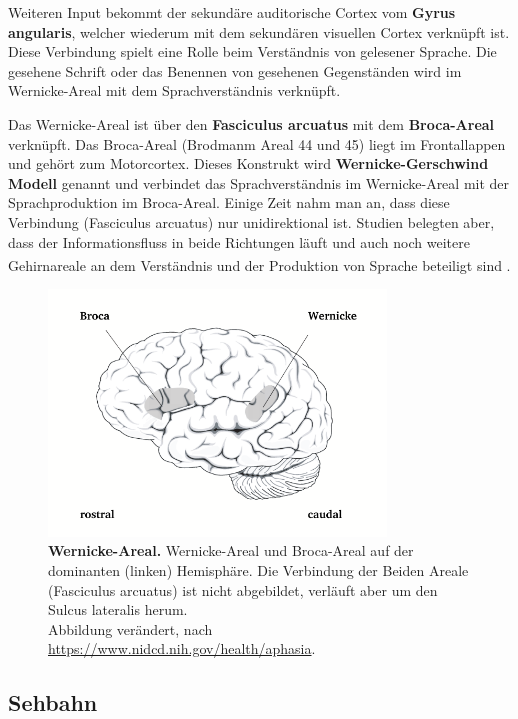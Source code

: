 Weiteren Input bekommt der sekundäre auditorische Cortex vom \textbf{Gyrus angularis}, welcher wiederum mit dem sekundären visuellen Cortex verknüpft ist. Diese Verbindung spielt eine Rolle beim Verständnis von gelesener Sprache. Die gesehene Schrift oder das Benennen von gesehenen Gegenständen wird im Wernicke-Areal mit dem Sprachverständnis verknüpft. 

Das Wernicke-Areal ist über den \textbf{Fasciculus arcuatus}  mit dem \textbf{Broca-Areal}  verknüpft. Das Broca-Areal (Brodmanm Areal 44 und 45) liegt im Frontallappen und gehört zum Motorcortex. Dieses Konstrukt wird \textbf{Wernicke-Gerschwind Modell}  genannt und verbindet das Sprachverständnis im Wernicke-Areal mit der Sprachproduktion im Broca-Areal. Einige Zeit nahm man an, dass diese Verbindung (Fasciculus arcuatus) nur unidirektional ist. Studien belegten aber, dass der Informationsfluss in beide Richtungen läuft und auch noch weitere Gehirnareale an dem Verständnis und der Produktion von Sprache beteiligt sind \textsuperscript{\cite[Kap.~60]{kandel2013principles}}.

\begin{figure}[H]
    \centering
    \includegraphics[width=0.8\textwidth]{pictures/auditory/Wernicke.png}
    \caption[Wernicke-Areal]{\textbf{Wernicke-Areal.} Wernicke-Areal und Broca-Areal auf der dominanten (linken) Hemisphäre. Die Verbindung der Beiden Areale (Fasciculus arcuatus) ist nicht abgebildet, verläuft aber um den Sulcus lateralis herum.\\
    Abbildung verändert, nach \url{https://www.nidcd.nih.gov/health/aphasia}.}
    \label{fig:Wernicke}
\end{figure}

\newpage
\subsection{Sehbahn}

